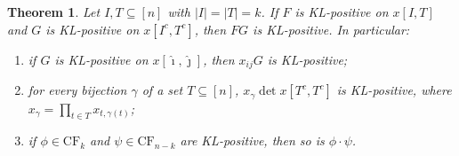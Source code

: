 \documentclass[11pt]{amsart}
\newtheorem{theorem}{Theorem}[section]
\theoremstyle{definition}
\theoremstyle{remark}
\newcommand{\CF}{\mathrm{CF}}
\begin{document}
\begin{theorem}\label{thm:R2}
Let $I,T\subseteq[n]$ with $|I|=|T|=k$. If $F$ is KL-positive on $x[I,T]$ and $G$ is KL-positive on $x[I^c,T^c]$, then $FG$ is KL-positive. In particular:
\begin{enumerate}
\item if $G$ is KL-positive on $x[\hat\imath,\hat\jmath]$, then $x_{ij}G$ is KL-positive;
\item for every bijection $\gamma$ of a set $T\subseteq[n]$, $x_\gamma\det x[T^c,T^c]$ is KL-positive, where $x_\gamma=\prod_{t\in T}x_{t,\gamma(t)}$;
\item if $\phi\in\CF_k$ and $\psi\in\CF_{n-k}$ are KL-positive, then so is $\phi\cdot\psi$.
\end{enumerate}
\end{theorem}
\end{document}

